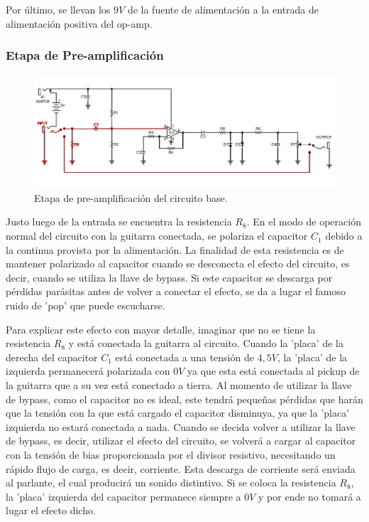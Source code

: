 Por último, se llevan los $9V$ de la fuente de alimentación a la entrada de alimentación positiva del op-amp.


\subsubsection{Etapa de Pre-amplificación}

\begin{figure}[H]
	\centering
	\includegraphics[width=1\textwidth, trim={0 0 0 0}, clip]{Ejercicio5/Imagenes/Circuito_base/circuito_base_preamplificacion.png}
	\caption{Etapa de pre-amplificación del circuito base.}
	\label{fig:circuito_base_preamplificacion}
\end{figure}

Justo luego de la entrada se encuentra la resistencia $R_8$. En el modo de operación normal del circuito con la guitarra conectada, se polariza el capacitor $C_1$ debido a la continua provista por la alimentación. La finalidad de esta resistencia es de mantener polarizado al capacitor cuando se desconecta el efecto del circuito, es decir, cuando se utiliza la llave de bypass. Si este capacitor se descarga por pérdidas parásitas antes de volver a conectar el efecto, se da a lugar el famoso ruido de 'pop' que puede escucharse.

Para explicar este efecto con mayor detalle, imaginar que no se tiene la resistencia $R_8$ y está conectada la guitarra al circuito. Cuando la 'placa' de la derecha del capacitor $C_1$ está conectada a una tensión de $4,5V$, la 'placa' de la izquierda permanecerá polarizada con $0V$ ya que esta está conectada al pickup de la guitarra que a su vez está conectado a tierra. Al momento de utilizar la llave de bypass, como el capacitor no es ideal, este tendrá pequeñas pérdidas que harán que la tensión con la que está cargado el capacitor disminuya, ya que la 'placa' izquierda no estará conectada a nada. Cuando se decida volver a utilizar la llave de bypass, es decir, utilizar el efecto del circuito, se volverá a cargar al capacitor con la tensión de bias proporcionada por el divisor resistivo, necesitando un rápido flujo de carga, es decir, corriente. Esta descarga de corriente será enviada al parlante, el cual producirá un sonido distintivo. Si se coloca la resistencia $R_8$, la 'placa' izquierda del capacitor permanece siempre a $0V$ y por ende no tomará a lugar el efecto dicho.

